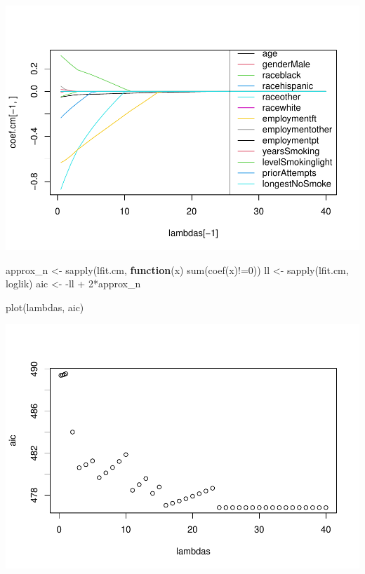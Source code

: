 \documentclass[
]{article}
\newenvironment{Shaded}{\begin{snugshade}}{\end{snugshade}}
\newcommand{\ControlFlowTok}[1]{\textcolor[rgb]{0.13,0.29,0.53}{\textbf{#1}}}
\newcommand{\DecValTok}[1]{\textcolor[rgb]{0.00,0.00,0.81}{#1}}
\newcommand{\FunctionTok}[1]{\textcolor[rgb]{0.00,0.00,0.00}{#1}}
\newcommand{\NormalTok}[1]{#1}
\newcommand{\OtherTok}[1]{\textcolor[rgb]{0.56,0.35,0.01}{#1}}
\newcommand{\SpecialCharTok}[1]{\textcolor[rgb]{0.00,0.00,0.00}{#1}}
\begin{document}
\includegraphics{hw_7_files/figure-latex/unnamed-chunk-5-1.pdf}

\begin{Shaded}
\begin{Highlighting}[]
\NormalTok{approx\_n }\OtherTok{\textless{}{-}} \FunctionTok{sapply}\NormalTok{(lfit.cm, }\ControlFlowTok{function}\NormalTok{(x) }\FunctionTok{sum}\NormalTok{(}\FunctionTok{coef}\NormalTok{(x)}\SpecialCharTok{!=}\DecValTok{0}\NormalTok{))}
\NormalTok{ll }\OtherTok{\textless{}{-}} \FunctionTok{sapply}\NormalTok{(lfit.cm, loglik)}
\NormalTok{aic }\OtherTok{\textless{}{-}} \SpecialCharTok{{-}}\NormalTok{ll }\SpecialCharTok{+} \DecValTok{2}\SpecialCharTok{*}\NormalTok{approx\_n}

\FunctionTok{plot}\NormalTok{(lambdas, aic)}
\end{Highlighting}
\end{Shaded}

\includegraphics{hw_7_files/figure-latex/unnamed-chunk-5-2.pdf}
\end{document}
